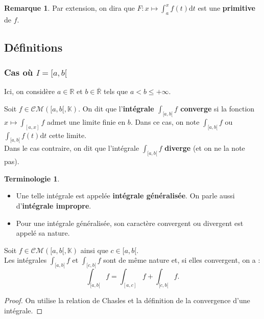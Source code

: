 \documentclass[french]{article}
\newcommand{\R}{\mathbb{R}}
\newcommand{\K}{\mathbb{K}}
\renewcommand{\d}{\text{d}}
\theoremstyle{plain}
\theoremstyle{definition}
\newtheorem*{rmq}{Remarque}
\newtheorem*{terminologie}{Terminologie}
\theoremstyle{remark}
\begin{document}
\begin{rmq}
	Par extension, on dira que $F:x\mapsto\displaystyle\int_{a}^{x}f(t)\d t$ est une \textbf{primitive} de $f$.
\end{rmq}

\subsection{Définitions}

\subsubsection*{Cas où $I=[a,b[$}

Ici, on considère $a\in\R$ et $b\in\overline{\R}$ tels que $a<b\leqslant+\infty$.

\begin{dfn}
	Soit $f\in\mathcal{CM}([a,b[,\K)$.
	On dit que l'\textbf{intégrale $\displaystyle\int_{[a,b[}f$ converge} si la fonction $x\mapsto\displaystyle\int_{[a,x]}f$ admet une limite finie en $b$. Dans ce cas, on note $\displaystyle\int_{[a,b[}f$ ou $\displaystyle\int_{[a,b[}f(t)\d t$ cette limite.\\
	Dans le cas contraire, on dit que l'intégrale $\displaystyle\int_{[a,b[}f$ \textbf{diverge} (et on ne la note pas).
\end{dfn}

\begin{terminologie}
	\begin{itemize}
	\item Une telle intégrale est appelée \textbf{intégrale généralisée}. On parle aussi d'\textbf{intégrale impropre}.
	\item Pour une intégrale généralisée, son caractère convergent ou divergent est appelé sa nature.
\end{itemize}
\end{terminologie}

\begin{prop}%
	Soit $f\in\mathcal{CM}([a,b[,\K)$ ainsi que $c\in[a,b[$.\\
	Les intégrales $\displaystyle\int_{[a,b[}f$ et $\displaystyle\int_{[c,b[}f$ sont de même nature et, si elles convergent, on a :
	$$\int_{[a,b[}f=\int_{[a,c]}f+\int_{[c,b[}f.$$
\end{prop}
\begin{proof}
	On utilise la relation de Chasles et la définition de la convergence d'une intégrale.
\end{proof}
\end{document}
